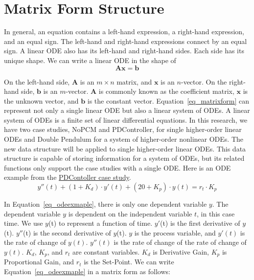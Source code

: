 \section{Matrix Form Structure}
In general, an equation contains a left-hand expression, a right-hand expression, and an equal sign. The left-hand and right-hand expressions connect by an equal sign. A linear ODE also has its left-hand and right-hand sides. Each side has its unique shape. We can write a linear ODE in the shape of
\begin{equation} \label{eq_matrixform}
	\boldsymbol{Ax} = \boldsymbol{b}
\end{equation}

On the left-hand side, $\boldsymbol{A}$ is an $m \times n$ matrix, and $\boldsymbol{x}$ is an $n$-vector. On the right-hand side, $\boldsymbol{b}$ is an $m$-vector. $\boldsymbol{A}$ is commonly known as the coefficient matrix, $\boldsymbol{x}$ is the unknown vector, and $\boldsymbol{b}$ is the constant vector. Equation~\ref{eq_matrixform} can represent not only a single linear ODE but also a linear system of ODEs. A linear system of ODEs is a finite set of linear differential equations. In this research, we have two case studies, NoPCM and PDController, for single higher-order linear ODEs and Double Pendulum for a system of higher-order nonlinear ODEs. The new data structure will be applied to single higher-order linear ODEs. This data structure is capable of storing information for a system of ODEs, but its related functions only support the case studies with a single ODE. Here is an ODE example from the \href{https://jacquescarette.github.io/Drasil/examples/pdcontroller/SRS/srs/PDController_SRS.html#Sec:IMs}{PDContoller case study}.
\begin{equation} \label{eq_odeexmaple}
	y''(t) + (1 + K_d) \cdot y'(t) + (20 + K_p) \cdot y(t) = r_t \cdot K_p
\end{equation}

In Equation~\ref{eq_odeexmaple}, there is only one dependent variable $y$. The dependent variable $y$ is dependent on the independent variable $t$, in this case time. We use $y$(t) to represent a function of time. $y'$(t) is the first derivative of $y$(t). $y''$(t) is the second derivative of $y$(t). $y$ is the process variable, and $y'(t)$ is the rate of change of $y(t)$. $y''(t)$ is the rate of change of the rate of change of $y(t)$. $K_d$, $K_p$, and $r_t$ are constant variables. $K_d$ is Derivative Gain, $K_p$ is Proportional Gain, and $r_t$ is the Set-Point. We can write Equation~\ref{eq_odeexmaple} in a matrix form as follows:

